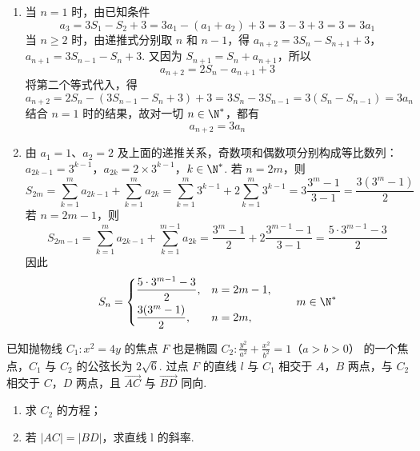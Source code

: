 \begin{solution}
\begin{enumerate}
\item 当 \(n=1\) 时，由已知条件
\[
a_{3}=3S_{1}-S_{2}+3=3a_{1}-(a_{1}+a_{2})+3=3-3+3=3=3a_{1}
\]
当 \(n\geqslant2\) 时，由递推式分别取 \(n\) 和 \(n-1\)，得
\(a_{n+2}=3S_{n}-S_{n+1}+3\)，\(a_{n+1}=3S_{n-1}-S_{n}+3\).
又因为 \(S_{n+1}=S_n+a_{n+1}\)，所以
\[
a_{n+2}=2S_n-a_{n+1}+3
\]
将第二个等式代入，得
\[
a_{n+2}=2S_n-(3S_{n-1}-S_n+3)+3
 =3S_n-3S_{n-1}=3(S_n-S_{n-1})=3a_n
\]
结合 \(n=1\) 时的结果，故对一切 \(n\in\N^{*}\)，都有
\[
a_{n+2}=3a_n
\]

\item 由 \(a_1=1\)、\(a_2=2\) 及上面的递推关系，奇数项和偶数项分别构成等比数列：
\(a_{2k-1}=3^{k-1}\)，\(a_{2k}=2\times3^{k-1}\)，\(k\in\N^{*}\).
若 \(n=2m\)，则
\[
S_{2m}=\sum_{k=1}^{m}a_{2k-1}+\sum_{k=1}^{m}a_{2k}
 =\sum_{k=1}^{m}3^{k-1}+2\sum_{k=1}^{m}3^{k-1}
 =3\frac{3^{m}-1}{3-1}
 =\frac{3(3^{m}-1)}{2}
\]
若 \(n=2m-1\)，则
\[
S_{2m-1}=\sum_{k=1}^{m}a_{2k-1}+\sum_{k=1}^{m-1}a_{2k}
 =\frac{3^{m}-1}{2}+2\frac{3^{m-1}-1}{3-1}
 =\frac{5\cdot3^{m-1}-3}{2}
\]
因此
\[
S_n=
\begin{cases}
\dfrac{5\cdot3^{m-1}-3}{2},&n=2m-1,\\[6pt]
\dfrac{3(3^m-1)}{2},&n=2m,
\end{cases}
\qquad m\in\N^{*}
\]
\end{enumerate}
\end{solution}

\begin{problem}
已知抛物线 \(C_1: x^2 = 4y\) 的焦点 \(F\) 也是椭圆 \(C_2: \frac{y^2}{a^2} + \frac{x^2}{b^2} = 1\)（\(a > b > 0\)） 的一个焦点，\(C_1\) 与 \(C_2\) 的公弦长为 \(2\sqrt{6}\). 过点 \(F\) 的直线 \(l\) 与 \(C_1\) 相交于 \(A\)，\(B\) 两点，与 \(C_2\) 相交于 \(C\)，\(D\) 两点，且 \(\overrightarrow{AC}\) 与 \(\overrightarrow{BD}\) 同向.
\begin{enumerate}
\item 求 \(C_{2}\) 的方程；
\item 若 \( \left|AC\right|=\left|BD\right| \)，求直线 l 的斜率.
\end{enumerate}
\end{problem}

